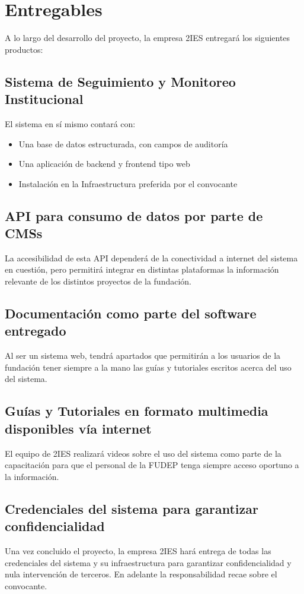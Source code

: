 \section{Entregables}

A lo largo del desarrollo del proyecto, la empresa 2IES entregará los siguientes productos:

\subsection{Sistema de Seguimiento y Monitoreo Institucional}

El sistema en sí mismo contará con:
\begin{itemize}
    \item Una base de datos estructurada, con campos de auditoría
    \item Una aplicación de backend y frontend tipo web
    \item Instalación en la Infraestructura preferida por el convocante
\end{itemize}

\subsection{API para consumo de datos por parte de CMSs}

La accesibilidad de esta API dependerá de la conectividad a internet del sistema en cuestión, pero permitirá integrar en distintas plataformas la información relevante de los distintos proyectos de la fundación.

\subsection{Documentación como parte del software entregado}

Al ser un sistema web, tendrá apartados que permitirán a los usuarios de la fundación tener siempre a la mano las guías y tutoriales escritos acerca del uso del sistema.

\subsection{Guías y Tutoriales en formato multimedia disponibles vía internet}

El equipo de 2IES realizará videos sobre el uso del sistema como parte de la capacitación para que el personal de la FUDEP tenga siempre acceso oportuno a la información.

\subsection{Credenciales del sistema para garantizar confidencialidad}

Una vez concluido el proyecto, la empresa 2IES hará entrega de todas las credenciales del sistema y su infraestructura para garantizar confidencialidad y nula intervención de terceros. En adelante la responsabilidad recae sobre el convocante.

